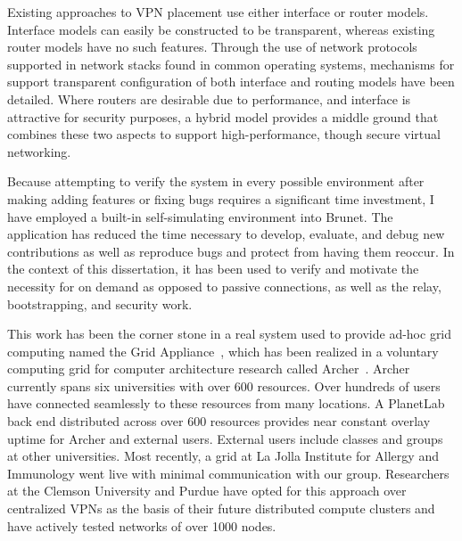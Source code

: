 Existing approaches to VPN placement use either interface or router models.
Interface models can easily be constructed to be transparent, whereas existing
router models have no such features.  Through the use of network protocols
supported in network stacks found in common operating systems, mechanisms for
support transparent configuration of both interface and routing models have
been detailed.  Where routers are desirable due to performance, and interface
is attractive for security purposes, a hybrid model provides a middle ground
that combines these two aspects to support high-performance, though secure
virtual networking.

Because attempting to verify the system in every possible environment after
making adding features or fixing bugs requires a significant time investment, I
have employed a built-in self-simulating environment into Brunet.  The
application has reduced the time necessary to develop, evaluate, and debug new
contributions as well as reproduce bugs and protect from having them reoccur.
In the context of this dissertation, it has been used to verify and motivate
the necessity for on demand as opposed to passive connections, as well as the
relay, bootstrapping, and security work.

This work has been the corner stone in a real system used to provide ad-hoc
grid computing named the Grid Appliance~\cite{gridappliance}, which has been
realized in a voluntary computing grid for computer architecture research
called Archer~\cite{archer}.  Archer currently spans six universities with over
600 resources.  Over hundreds of users have connected seamlessly to these
resources from many locations.  A PlanetLab back end distributed across over
600 resources provides near constant overlay uptime for Archer and external
users.  External users include classes and groups at other universities.  Most
recently, a grid at La Jolla Institute for Allergy and Immunology went live
with minimal communication with our group.  Researchers at the Clemson
University and Purdue have opted for this approach over centralized VPNs as the
basis of their future distributed compute clusters and have actively tested
networks of over 1000 nodes.

